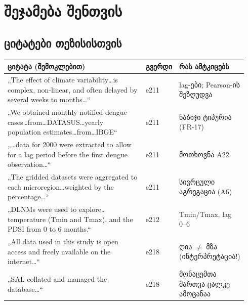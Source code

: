 \documentclass[11pt,a4paper]{article}
\begin{document}
\section{შეჯამება შენთვის}

\subsection*{ციტატები თეზისისთვის}
\begin{longtable}{@{}p{0.6\linewidth}p{0.1\linewidth}p{0.24\linewidth}@{}}
\toprule
\textbf{ციტატა (შემოკლებით)} & \textbf{გვერდი} & \textbf{რას ამტკიცებს}\\
\midrule
„The effect of climate variability\ldots is complex, non-linear, and often delayed by several weeks to months\ldots“ & e211 & lag-ები; Pearson-ის შეზღუდვა\\
„We obtained monthly notified dengue cases\ldots from\ldots DATASUS\ldots yearly population estimates\ldots from\ldots IBGE“ & e211 & ნაბიჯი ტიპურია (FR-17)\\
„\ldots data for 2000 were extracted to allow for a lag period before the first dengue observation\ldots“ & e211 & მოთხოვნა A22\\
„The gridded datasets were aggregated to each microregion\ldots weighted by the percentage\ldots“ & e211 & სივრცული აგრეგაცია (A6)\\
„DLNMs were used to explore\ldots temperature (Tmin and Tmax), and the PDSI from 0 to 6 months.“ & e212 & Tmin/Tmax, lag 0--6\\
„All data used in this study is open access and freely available on the internet\ldots“ & e218 & ღია $\neq$ მზა (ინტერპრეტაცია!)\\
„SAL collated and managed the database\ldots“ & e218 & მონაცემთა მართვა ცალკე ამოცანაა\\
\bottomrule
\end{longtable}
\end{document}
